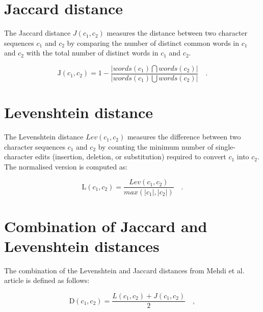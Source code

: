 \documentclass[a4paper, 12pt]{book}
\begin{document}
\section{Jaccard distance}
\label{sec:jaccard-definition}

The Jaccard distance $J(c_{1}, c_{2})$ measures the distance between two character sequences $c_{1}$ and $c_{2}$ by comparing the number of distinct common words in $c_{1}$ and $c_{2}$ with the total number of distinct words in $c_{1}$ and $c_{2}$. 

\begin{center}
    \begin{equation}
    \mathrm{J}(c_{1}, c_{2}) = 1 - \frac{\left | words(c_{1})\bigcap words(c_{2}) \right | }{\left | words(c_{1})\bigcup words(c_{2}) \right | } \quad .
    \end{equation}
\end{center}

\section{Levenshtein distance}
\label{sec:levenshtein-definition}

The Levenshtein distance $Lev(c_{1}, c_{2})$ measures the difference between two character sequences $c_{1}$ and $c_{2}$ by counting the minimum number of single-character edits (insertion, deletion, or substitution) required to convert $c_{1}$ into $c_{2}$. The normalised version is computed as: 

\begin{center}
    \begin{equation}
        \mathrm{L}(c_{1}, c_{2}) = \frac{\textit{Lev}(c_{1}, c_{2})}{\textit{max}(\left | c_{1} \right |, \left | c_{2} \right | )} \quad .
    \end{equation}
\end{center}

\section{Combination of Jaccard and Levenshtein distances}
\label{sec:jacc-lev-comb-definition}

The combination of the Levenshtein and Jaccard distances from Mehdi et al. article is defined as follows:

\begin{center}
    \begin{equation}
        \mathrm{D}(c_{1}, c_{2}) = \frac{\textit{L}(c_{1}, c_{2}) + \textit{J}(c_{1}, c_{2})}{2} \quad ,
    \end{equation}
\end{center}
\end{document}
